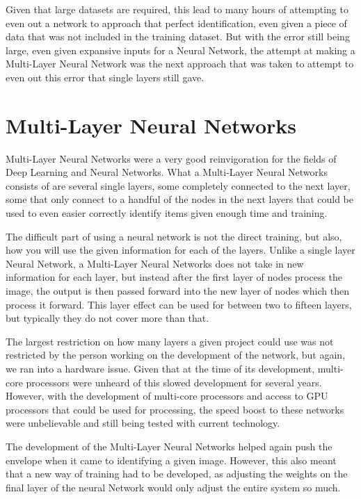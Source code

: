 \documentclass{article}
\begin{document}
Given that large datasets are required, this lead to many hours of attempting to even out a network to approach that perfect identification, even given a piece of data that was not included in the training dataset. But with the error still being large, even given expansive inputs for a Neural Network, the attempt at making a Multi-Layer Neural Network was the next approach that was taken to attempt to even out this error that single layers still gave.

\section{Multi-Layer Neural Networks}
Multi-Layer Neural Networks were a very good reinvigoration for the fields of Deep Learning and Neural Networks. What a Multi-Layer Neural Networks consists of are several single layers, some completely connected to the next layer, some that only connect to a handful of the nodes in the next layers that could be used to even easier correctly identify items given enough time and training.

The difficult part of using a neural network is not the direct training, but also, how you will use the given information for each of the layers. Unlike a single layer Neural Network, a Multi-Layer Neural Networks does not take in new information for each layer, but instead after the first layer of nodes process the image, the output is then passed forward into the new layer of nodes which then process it forward. This layer effect can be used for between two to fifteen layers, but typically they do not cover more than that.

The largest restriction on how many layers a given project could use was not restricted by the person working on the development of the network, but again, we ran into a hardware issue. Given that at the time of its development, multi-core processors were unheard of this slowed development for several years. However, with the development of multi-core processors and access to GPU processors that could be used for processing, the speed boost to these networks were unbelievable and still being tested with current technology.

The development of the Multi-Layer Neural Networks helped again push the envelope when it came to identifying a given image. However, this also meant that a new way of training had to be developed, as adjusting the weights on the final layer of the neural Network would only adjust the entire system so much.  
\end{document}
